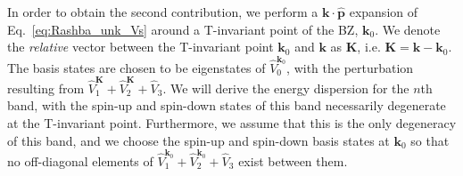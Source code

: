 In order to obtain the second contribution, we perform a $\bm k \cdot \hat{\bm p}$ expansion of Eq.~\eqref{eq:Rashba_unk_Vs} around a \gls{T}-invariant point of the \gls{BZ}, $\bm k_0$\cite{Rashba1959SymmetryAr,Lowdin1951,Bahramy2011}.
We denote the {\it relative} vector between the \gls{T}-invariant point $\bm k_0$ and $\bm k$ as $\bm K$, i.e. $\bm K = \bm k - \bm k_0$.
The basis states are chosen to be eigenstates of $\hat{V}_0^{\bm k_0}$, with the perturbation resulting from $\hat{V}^{\bm K}_1 + \hat{V}^{\bm K}_2 + \hat{V}_3$.
We will derive the energy dispersion for the $n$th band, with the spin-up and spin-down states of this band necessarily degenerate at the \gls{T}-invariant point.%
 Furthermore, we assume that this is the only degeneracy of this band, and we choose the spin-up and spin-down basis states at $\bm k_0$ so that no off-diagonal elements of $ \hat{V}_1^{\bm k_0} + \hat{V}_2^{\bm k_0} + \hat{V}_3$ exist between them.

